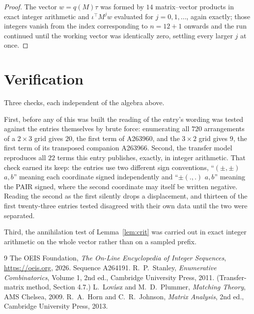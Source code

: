 \documentclass[11pt,a4paper]{article}
\theoremstyle{plain}
\theoremstyle{definition}
\begin{document}
\begin{proof}
The vector $w=q(M)\tau$ was formed by $14$ matrix--vector products in exact integer
arithmetic and $\iota^{\!\top}M^{j}w$ evaluated for $j=0,1,\dots$, again exactly; those
integers vanish from the index corresponding to $n=12+1$ onwards and the run continued
until the working vector was identically zero, settling every larger $j$ at once.
\end{proof}

\section{Verification}

Three checks, each independent of the algebra above.

First, before any of this was built the reading of the entry's wording was tested against the
entries themselves by brute force: enumerating all $720$ arrangements of a $2\times3$ grid
gives $20$, the first term of A263960, and the $3\times2$ grid gives $9$, the first term of its
transposed companion A263966. Second, the transfer model reproduces all $22$ terms this
entry publishes, exactly, in integer arithmetic. That check earned its keep: the entries use
two different sign conventions, ``$(\pm,\pm)$ $a,b$'' meaning each coordinate signed
independently and ``$\pm(.,.)$ $a,b$'' meaning the PAIR signed, where the second coordinate may
itself be written negative. Reading the second as the first silently drops a displacement, and
thirteen of the first twenty-three entries tested disagreed with their own data until the two
were separated.

Third, the annihilation test of Lemma~\ref{lem:crit} was carried out in exact integer
arithmetic on the whole vector rather than on a sampled prefix.

\begin{thebibliography}{9}
 The OEIS Foundation, \emph{The On-Line Encyclopedia of Integer
Sequences}, \url{https://oeis.org}, 2026. Sequence A264191.
 R.~P.~Stanley, \emph{Enumerative Combinatorics}, Volume 1, 2nd ed.,
Cambridge University Press, 2011. (Transfer-matrix method, Section 4.7.)
 L.~Lov\'asz and M.~D.~Plummer, \emph{Matching Theory}, AMS Chelsea, 2009.
 R.~A.~Horn and C.~R.~Johnson, \emph{Matrix Analysis}, 2nd ed., Cambridge
University Press, 2013.
\end{thebibliography}
\end{document}
